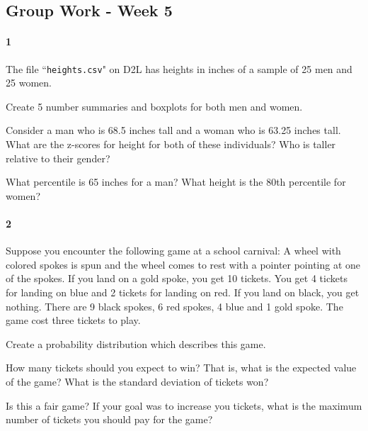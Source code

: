 \documentclass{article}
\begin{document}
\begin{flushleft}
\section*{Group Work - Week 5}

\paragraph{1} The file ``\verb+heights.csv+" on D2L has heights in inches of a sample of 25 men and 25 women.\\ \medskip


\begin{enumalpha}
\item Create 5 number summaries and boxplots for both men and women.
\vspace{1.75in}

\item Consider a man who is 68.5 inches tall and a woman who is 63.25 inches tall. What are the z-scores for height for both of these individuals? Who is taller relative to their gender?
\vspace{1.75in}

\item What percentile is 65 inches for a man? What height is the 80th percentile for women?

\end{enumalpha}

\newpage
\paragraph{2} Suppose you encounter the following game at a school carnival: A wheel with colored spokes is spun and the wheel comes to rest with a pointer pointing at one of the spokes. If you land on a gold spoke, you get 10 tickets. You get 4 tickets for landing on blue and 2 tickets for landing on red. If you land on black, you get nothing. There are 9 black spokes, 6 red spokes, 4 blue and 1 gold spoke. The game cost three tickets to play.

\begin{enumalpha}
\item Create a probability distribution which describes this game.
\vspace{1.75in}

\item How many tickets should you expect to win? That is, what is the expected value of the game? What is the standard deviation of tickets won?
\vspace{1.75in}

\item Is this a fair game? If your goal was to increase you tickets, what is the maximum number of tickets you should pay for the game?
\end{enumalpha} 
\end{flushleft}
\end{document}
